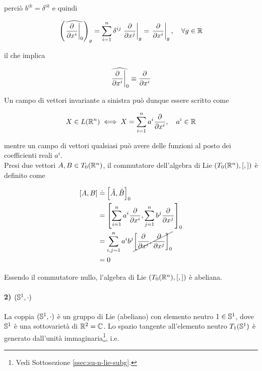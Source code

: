 perciò $ b^{ik} = \delta^{ik} $ e quindi

\begin{equation}
	\left( \widehat{ \eval{ \pdv{x^{i}} }_{0} } \right)_{g} = \sum_{i=1}^{n} \delta^{ij} \eval{ \pdv{x^{j}} }_{g} %
	= \eval{ \pdv{x^{i}} }_{g} \qcomma \forall g \in \R
\end{equation}

il che implica

\begin{equation}
	\widehat{ \eval{ \pdv{x^{i}} }_{0} } \equiv \pdv{x^{i}}
\end{equation}

Un campo di vettori invariante a sinistra può dunque essere scritto come

\begin{equation}
	X \in L(\R^{n}) \iff X = \sum_{i=1}^{n} a^{i} \pdv{x^{i}} \qcomma a^{i} \in \R
\end{equation}

mentre un campo di vettori qualsiasi può avere delle funzioni al posto dei coefficienti reali $ a^{i} $.\\
Presi due vettori $ A,B \in T_{0}(\R^{n}) $, il commutatore dell'algebra di Lie $ (T_{0}(\R^{n}),[,]) $ è definito come

\begin{align}
	\begin{split}
		\comm{A}{B} &\doteq \comm{\hat{A}}{\hat{B}}_{0} \\
		&= \comm{ \sum_{i=1}^{n} a^{i} \pdv{x^{i}} }{ \sum_{j=1}^{n} b^{j} \pdv{x^{j}} }_{0} \\
		&= \sum_{i,j=1}^{n} a^{i} b^{j} \cancel{ \comm{ \pdv{x^{i}} }{ \pdv{x^{j}} }_{0} } \\
		&= 0
	\end{split}
\end{align}

Essendo il commutatore nullo, l'algebra di Lie $ (T_{0}(\R^{n}),[,]) $ è abeliana.

\paragraph{2) $ (\S^{1},\cdot) $}

La coppia $ (\S^{1},\cdot) $ è un gruppo di Lie (abeliano) con elemento neutro $ 1 \in \S^{1} $, dove $ \S^{1} $ è una sottovarietà di $ \R^{2} = \C $. Lo spazio tangente all'elemento neutro $ T_{1}(\S^{1}) $ è generato dall'unità immaginaria\footnote{%
	Vedi Sottosezione \ref{ssec:su-n-lie-subg}.%
}, i.e.

